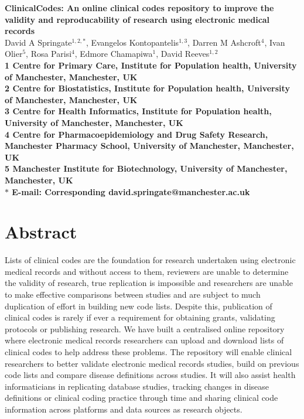 \documentclass[10pt]{article}
\date{}
\begin{document}
\begin{flushleft}
{\Large
\textbf{ClinicalCodes: An online clinical codes repository to improve the validity and reproducability of research using electronic medical records}
}
\\
David A Springate$^{1,2,\ast}$, 
Evangelos Kontopantelis$^{1,3}$,
Darren M Ashcroft$^{4}$,
Ivan Olier$^{5}$,
Rosa Parisi$^{4}$,
Edmore Chamapiwa$^{1}$,
David Reeves$^{1,2}$
\\
\bf{1} Centre for Primary Care, Institute for Population health, University of Manchester, Manchester, UK
\\
\bf{2} Centre for Biostatistics, Institute for Population health, University of Manchester, Manchester, UK
\\
\bf{3} Centre for Health Informatics, Institute for Population health, University of Manchester, Manchester, UK
\\
\bf{4} Centre for Pharmacoepidemiology and Drug Safety Research, Manchester Pharmacy School, University of Manchester, Manchester, UK
\\
\bf{5} Manchester Institute for Biotechnology, University of Manchester, Manchester, UK
\\
$\ast$ E-mail: Corresponding david.springate@manchester.ac.uk
\end{flushleft}

\section*{Abstract}

Lists of clinical codes are the foundation for research undertaken using electronic medical records and without access to them, reviewers are unable to determine the validity of research, true replication is impossible and researchers are unable to make effective comparisons between studies and are subject to much duplication of effort in building new code lists.  Despite this, publication of clinical codes is rarely if ever a requirement for obtaining grants, validating protocols or publishing research.  We have built a centralised online repository where electronic medical records researchers can upload and download lists of clinical codes to help address these problems.  The repository will enable clinical researchers to better validate electronic medical records studies, build on previous code lists and compare disease definitions across studies.  It will also assist health informaticians in replicating database studies, tracking changes in disease definitions or clinical coding practice through time and sharing clinical code information across platforms and data sources as research objects. 
\end{document}
